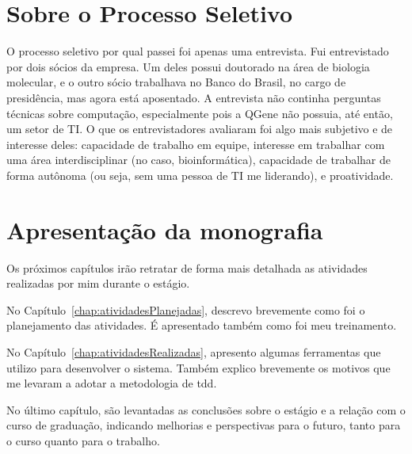 

\section{Sobre o Processo Seletivo}
O processo seletivo por qual passei foi apenas uma entrevista. Fui entrevistado por dois sócios da empresa. Um deles
possui doutorado na área de biologia molecular, e o outro sócio trabalhava no Banco do Brasil, no cargo de presidência,
mas agora está aposentado. A entrevista não continha perguntas técnicas sobre computação, especialmente pois a QGene não
possuia, até então, um setor de TI. O que os entrevistadores avaliaram foi algo mais subjetivo e de interesse deles:
capacidade de trabalho em equipe, interesse em trabalhar com uma área interdisciplinar (no caso, bioinformática),
capacidade de trabalhar de forma autônoma (ou seja, sem uma pessoa de TI me liderando), e proatividade.



\section{Apresentação da monografia}

Os próximos capítulos irão retratar de forma mais detalhada as atividades realizadas por mim durante o estágio.

No Capítulo~\ref{chap:atividadesPlanejadas}, descrevo brevemente como foi o planejamento das atividades. É apresentado também
como foi meu treinamento.

No Capítulo~\ref{chap:atividadesRealizadas}, apresento algumas ferramentas que utilizo para desenvolver o sistema. Também explico brevemente os motivos
que me levaram a adotar a metodologia de \gls{tdd}.

No último capítulo, são levantadas as conclusões sobre o estágio e a relação com 
o curso de graduação, indicando melhorias e perspectivas para o futuro, tanto para o curso 
quanto para o trabalho.
